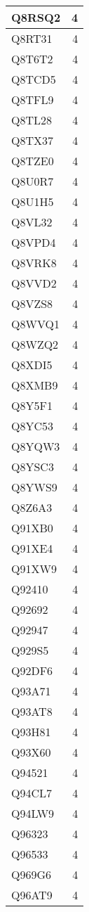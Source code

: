 \documentclass[
]{book}
\theoremstyle{definition}
\theoremstyle{definition}
\theoremstyle{definition}
\theoremstyle{definition}
\theoremstyle{remark}
\begin{document}
\begin{table}
\begin{tabular}{l|r}
\hline
Q8RSQ2 & 4\\
\hline
Q8RT31 & 4\\
\hline
Q8T6T2 & 4\\
\hline
Q8TCD5 & 4\\
\hline
Q8TFL9 & 4\\
\hline
Q8TL28 & 4\\
\hline
Q8TX37 & 4\\
\hline
Q8TZE0 & 4\\
\hline
Q8U0R7 & 4\\
\hline
Q8U1H5 & 4\\
\hline
Q8VL32 & 4\\
\hline
Q8VPD4 & 4\\
\hline
Q8VRK8 & 4\\
\hline
Q8VVD2 & 4\\
\hline
Q8VZS8 & 4\\
\hline
Q8WVQ1 & 4\\
\hline
Q8WZQ2 & 4\\
\hline
Q8XDI5 & 4\\
\hline
Q8XMB9 & 4\\
\hline
Q8Y5F1 & 4\\
\hline
Q8YC53 & 4\\
\hline
Q8YQW3 & 4\\
\hline
Q8YSC3 & 4\\
\hline
Q8YWS9 & 4\\
\hline
Q8Z6A3 & 4\\
\hline
Q91XB0 & 4\\
\hline
Q91XE4 & 4\\
\hline
Q91XW9 & 4\\
\hline
Q92410 & 4\\
\hline
Q92692 & 4\\
\hline
Q92947 & 4\\
\hline
Q929S5 & 4\\
\hline
Q92DF6 & 4\\
\hline
Q93A71 & 4\\
\hline
Q93AT8 & 4\\
\hline
Q93H81 & 4\\
\hline
Q93X60 & 4\\
\hline
Q94521 & 4\\
\hline
Q94CL7 & 4\\
\hline
Q94LW9 & 4\\
\hline
Q96323 & 4\\
\hline
Q96533 & 4\\
\hline
Q969G6 & 4\\
\hline
Q96AT9 & 4\\

\end{tabular}
\end{table}
\end{document}
